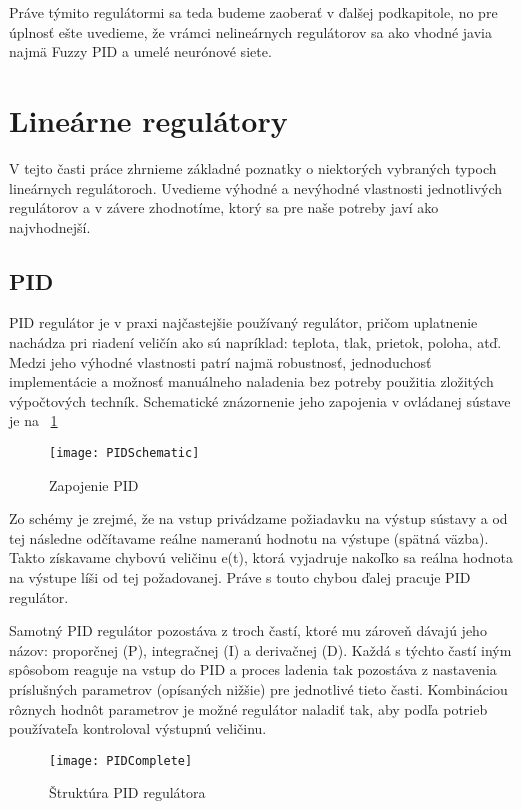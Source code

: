Práve týmito regulátormi sa teda budeme zaoberať v ďalšej podkapitole, no pre úplnosť ešte uvedieme, že vrámci nelineárnych regulátorov sa ako vhodné javia najmä Fuzzy PID a umelé neurónové siete.

\section{Lineárne regulátory}


V tejto časti práce zhrnieme základné poznatky o niektorých vybraných typoch lineárnych regulátoroch. Uvedieme výhodné a nevýhodné vlastnosti jednotlivých regulátorov a v závere zhodnotíme, ktorý sa pre naše potreby javí ako najvhodnejší.

\subsection{PID}


\ac{PID} regulátor je v praxi najčastejšie používaný regulátor, pričom uplatnenie nachádza  pri riadení veličín ako sú napríklad: teplota, tlak, prietok, poloha, atď. Medzi jeho výhodné vlastnosti patrí najmä robustnosť, jednoduchosť implementácie a možnosť manuálneho naladenia bez potreby použitia zložitých výpočtových techník.  Schematické znázornenie jeho zapojenia v ovládanej sústave je na \figurename~\ref{fig:PIDSchematic}

\begin{figure}
\centering
\texttt{[image: PIDSchematic]}
\caption{Zapojenie PID}
\label{fig:PIDSchematic}
\end{figure}

Zo schémy je zrejmé, že na vstup privádzame požiadavku na výstup sústavy a od tej následne odčítavame reálne nameranú hodnotu na výstupe (spätná väzba). Takto získavame chybovú veličinu e(t), ktorá vyjadruje nakoľko sa reálna hodnota na výstupe líši od tej požadovanej. Práve s touto chybou ďalej pracuje \ac{PID} regulátor.

Samotný PID regulátor pozostáva z troch častí, ktoré mu zároveň dávajú jeho názov: proporčnej (P), integračnej (I) a derivačnej (D). Každá s týchto častí iným spôsobom reaguje na vstup do PID a proces ladenia tak pozostáva z nastavenia príslušných parametrov (opísaných nižšie) pre jednotlivé tieto časti. Kombináciou rôznych hodnôt parametrov je možné regulátor naladiť tak, aby podľa potrieb používateľa kontroloval výstupnú veličinu. 

\begin{figure}
\centering
\texttt{[image: PIDComplete]}
\caption{Štruktúra PID regulátora}
\label{fig:PIDComplete}
\end{figure}


